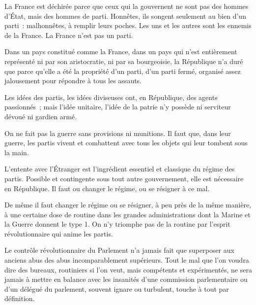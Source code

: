 \documentclass[french,twoside]{book} %
\newcommand{\astermono}{\medskip\centerline{\color{rubric}\large\selectfont{\syms ✻}}\medskip\par}%
\begin{document}
\astermono

\noindent La France est déchirée parce que ceux qui la gouvernent ne sont pas des hommes d’État, mais des hommes de parti. Honnêtes, ils songent seulement au bien d’un parti : malhonnêtes, à remplir leurs poches. Les uns et les autres sont les ennemis de la France. La France n’est pas un parti.\par

\astermono

\noindent Dans un pays constitué comme la France, dans un pays qui n’est entièrement représenté ni par son aristocratie, ni par sa bourgeoisie, la République n’a duré que parce qu’elle a été la propriété d’un parti, d’un parti fermé, organisé assez jalousement pour répondre à tous les assauts.\par
Les idées des partis, les idées diviseuses ont, en République, des agents passionnés ; mais l’idée unitaire, l’idée de la patrie n’y possède ni serviteur dévoué ni gardien armé.\par

\astermono

\noindent On ne fait pas la guerre sans provisions ni munitions. Il faut que, dans leur guerre, les partis vivent et combattent avec tous les objets qui leur tombent sous la main.\par
L’entente avec l’Étranger est l’ingrédient essentiel et classique du régime des partis. Possible et contingente sous tout autre gouvernement, elle est nécessaire en République. Il faut ou changer le régime, ou se résigner à ce mal.\par

\astermono

\noindent De même il faut changer le régime ou se résigner, à peu près de la même manière, à une certaine dose de routine dans les grandes administrations dont la Marine et la Guerre donnent le type 1. On n’y triomphe pas de la routine par l’esprit révolutionnaire qui anime les partis.\par
Le contrôle révolutionnaire du Parlement n’a jamais fait que superposer aux anciens abus des abus incomparablement supérieurs. Tout le mal que l’on voudra dire des bureaux, routiniers si l’on veut, mais compétents et expérimentés, ne sera jamais à mettre en balance avec les insanités d’une commission parlementaire ou d’un délégué du parlement, souvent ignare ou turbulent, touche à tout par définition.\par

\astermono
\end{document}

